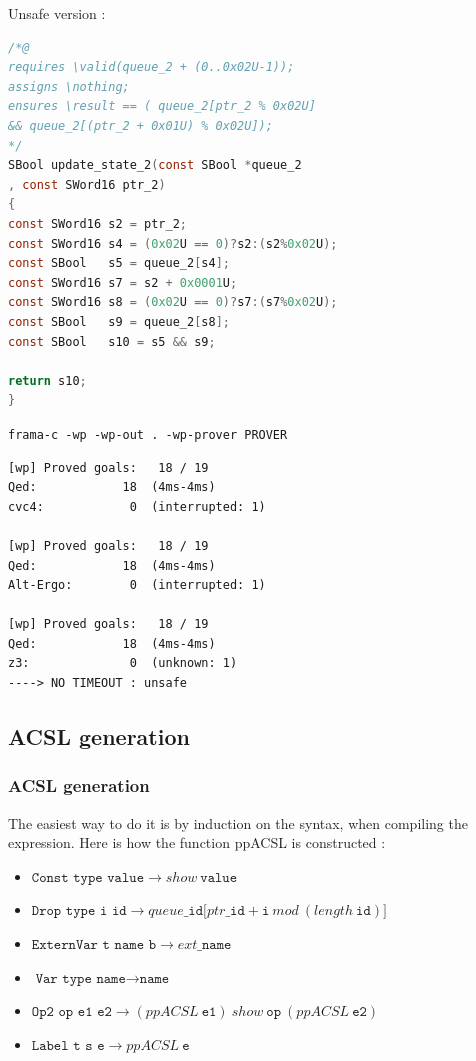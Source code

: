 \documentclass{beamer}
\begin{document}
\begin{frame}[fragile]
	\scriptsize 
	Unsafe version : 
\begin{lstlisting}[language=C]
/*@
requires \valid(queue_2 + (0..0x02U-1));
assigns \nothing;
ensures \result == ( queue_2[ptr_2 % 0x02U] 
&& queue_2[(ptr_2 + 0x01U) % 0x02U]);
*/
SBool update_state_2(const SBool *queue_2
, const SWord16 ptr_2)
{
const SWord16 s2 = ptr_2;
const SWord16 s4 = (0x02U == 0)?s2:(s2%0x02U);
const SBool   s5 = queue_2[s4];
const SWord16 s7 = s2 + 0x0001U;
const SWord16 s8 = (0x02U == 0)?s7:(s7%0x02U);
const SBool   s9 = queue_2[s8];
const SBool   s10 = s5 && s9;

return s10;
}
\end{lstlisting}

	
	
\end{frame}
\begin{frame}[fragile]
	\texttt{frama-c -wp -wp-out . -wp-prover PROVER}
	
\begin{lstlisting}[]
[wp] Proved goals:   18 / 19
Qed:            18  (4ms-4ms)
cvc4:            0  (interrupted: 1)

[wp] Proved goals:   18 / 19
Qed:            18  (4ms-4ms)
Alt-Ergo:        0  (interrupted: 1)

[wp] Proved goals:   18 / 19
Qed:            18  (4ms-4ms)
z3:              0  (unknown: 1)   
----> NO TIMEOUT : unsafe
\end{lstlisting}
	
\end{frame}

\subsection{ACSL generation}
\begin{frame}
	\tableofcontents[currentsubsection,sectionstyle=show/shaded,subsectionstyle=show/shaded/hide]
\end{frame}


\begin{frame}[fragile]
\frametitle{ACSL generation}
The easiest way to do it is by induction on the syntax, when compiling the expression. Here is how the function ppACSL is constructed :
\begin{itemize}
	\item $\texttt{Const~type~value} \rightarrow show~\texttt{value}$
	\item $\texttt{Drop~type~i~id} \rightarrow queue\_\texttt{id} \lbrack ptr\_\texttt{id} + \texttt{i} ~ mod ~ (length~\texttt{id}) \rbrack$
	\item $\texttt{ExternVar~t~name~b} \rightarrow ext\_\texttt{name}$
	\item $\texttt{Var type name} \rightarrow \texttt{name}$
	\item $\texttt{Op2 op e1 e2} \rightarrow (ppACSL~\texttt{e1})~show~\texttt{op}~(ppACSL~\texttt{e2})$
	\item $\texttt{Label~t~s~e} \rightarrow ppACSL~\texttt{e}$
\end{itemize}
\end{frame}
\end{document}

